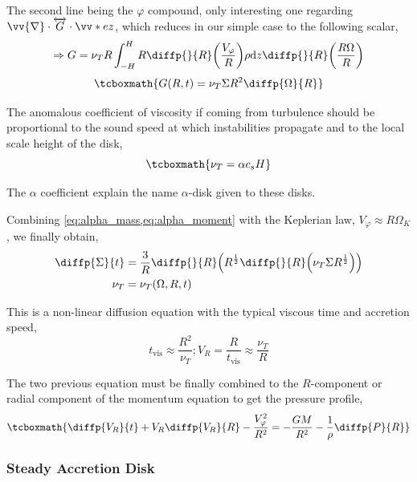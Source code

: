 \documentclass[10pt,a4paper,english]{article}
\let\originalleft\left
\let\originalright\right
\renewcommand{\left}{\mathopen{}\mathclose\bgroup\originalleft}
\renewcommand{\right}{\aftergroup\egroup\originalright}
\begin{document}
The second line being the $\varphi$ compound, only interesting one regarding
$\vv{\nabla} \cdot \overleftrightarrow{G} \cdot \vv*{e}{z}$, which reduces in our simple
case to the following scalar,
\begin{equation*}
    \Rightarrow G = \nu_T R \int_{-H}^H R \diffp{}{R} \left( \frac{V_\varphi}{R} \right) \rho \d{z} \diffp{}{R} \left(\frac{R \Omega}{R}\right)
\end{equation*}
\begin{equation}
    \tcboxmath{
        G(R,t) = \nu_T \Sigma R^2 \diffp{\Omega}{R}
    }
\end{equation}

The anomalous coefficient of viscosity if coming from turbulence should be
proportional to the sound speed at which instabilities propagate and to the
local scale height of the disk,
\begin{equation}
    \tcboxmath{
        \nu_T = \alpha c_s H
    }
\end{equation}

The $\alpha$ coefficient explain the name $\alpha$-disk given to these disks.

Combining \cref{eq:alpha_mass,eq:alpha_moment} with the Keplerian law,
$V_\varphi \approx R \Omega_K$, we finally obtain,
\begin{align*}
    \diffp{\Sigma}{t} &= \frac{3}{R} \diffp{}{R} \left( R^\frac{1}{2} \diffp{}{R} \left( \nu_T \Sigma R^\frac{1}{2} \right) \right) \\
    \nu_T &= \nu_T(\Omega,R,t)
\end{align*}

This is a non-linear diffusion equation with the typical viscous time and
accretion speed,
\begin{equation*}
    t_\mathrm{vis} \approx \frac{R^2}{\nu_T} ; V_R = \frac{R}{t_\mathrm{vis}} \approx \frac{\nu_T}{R}
\end{equation*}

The two previous equation must be finally combined to the $R$-component or
radial component of the momentum equation to get the pressure profile,
\begin{equation}
    \tcboxmath{
        \diffp{V_R}{t} + V_R \diffp{V_R}{R} - \frac{V_\varphi^2}{R^2} = - \frac{GM}{R^2} - \frac{1}{\rho} \diffp{P}{R}
    }
\end{equation}

\subsubsection{Steady Accretion Disk}
\end{document}
